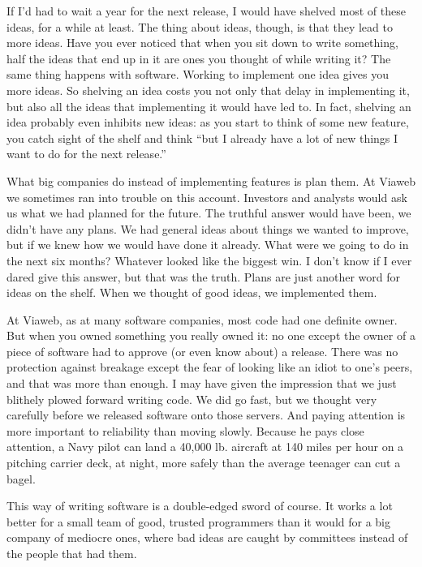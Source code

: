 If I'd had to wait a year for the next release, I would have shelved
most of these ideas, for a while at least. The thing about ideas,
though, is that they lead to more ideas. Have you ever noticed that when
you sit down to write something, half the ideas that end up in it are
ones you thought of while writing it? The same thing happens with
software. Working to implement one idea gives you more ideas. So
shelving an idea costs you not only that delay in implementing it, but
also all the ideas that implementing it would have led to. In fact,
shelving an idea probably even inhibits new ideas: as you start to think
of some new feature, you catch sight of the shelf and think ``but I
already have a lot of new things I want to do for the next release.''

What big companies do instead of implementing features is plan them. At
Viaweb we sometimes ran into trouble on this account. Investors and
analysts would ask us what we had planned for the future. The truthful
answer would have been, we didn't have any plans. We had general ideas
about things we wanted to improve, but if we knew how we would have done
it already. What were we going to do in the next six months? Whatever
looked like the biggest win. I don't know if I ever dared give this
answer, but that was the truth. Plans are just another word for ideas on
the shelf. When we thought of good ideas, we implemented them.

At Viaweb, as at many software companies, most code had one definite
owner. But when you owned something you really owned it: no one except
the owner of a piece of software had to approve (or even know about) a
release. There was no protection against breakage except the fear of
looking like an idiot to one's peers, and that was more than enough. I
may have given the impression that we just blithely plowed forward
writing code. We did go fast, but we thought very carefully before we
released software onto those servers. And paying attention is more
important to reliability than moving slowly. Because he pays close
attention, a Navy pilot can land a 40,000 lb. aircraft at 140 miles per
hour on a pitching carrier deck, at night, more safely than the average
teenager can cut a bagel.

This way of writing software is a double-edged sword of course. It works
a lot better for a small team of good, trusted programmers than it would
for a big company of mediocre ones, where bad ideas are caught by
committees instead of the people that had them.

